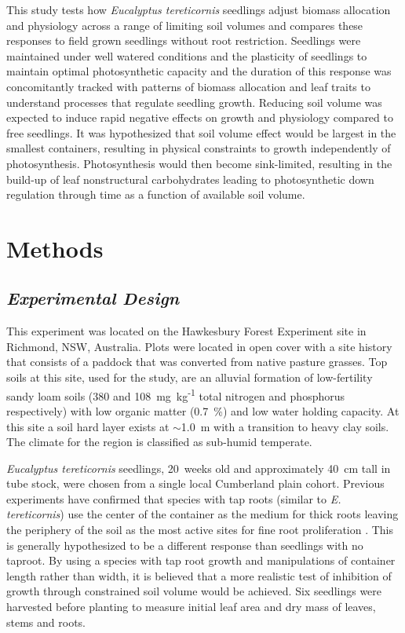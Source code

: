 \documentclass[a4paper]{article}\usepackage[]{graphicx}\usepackage[]{color}
\begin{document}
This study tests how \textit{Eucalyptus tereticornis} seedlings adjust biomass allocation and physiology across a range of limiting soil volumes and compares these responses to field grown seedlings without root restriction. Seedlings were maintained under well watered conditions and the plasticity of seedlings to maintain optimal photosynthetic capacity and the duration of this response was concomitantly tracked with patterns of biomass allocation and leaf traits to understand processes that regulate seedling growth. Reducing soil volume was expected to induce rapid negative effects on growth and physiology compared to free seedlings. It was hypothesized that soil volume effect would be largest in the smallest containers, resulting in physical constraints to growth independently of photosynthesis. Photosynthesis would then become sink-limited, resulting in the build-up of leaf nonstructural carbohydrates leading to photosynthetic down regulation through time as a function of available soil volume. 

\section*{Methods}

\subsection*{\textit{Experimental Design}}

This experiment was located on the Hawkesbury Forest Experiment site in Richmond, NSW, Australia. Plots were located in open cover with a site history that consists of a paddock that was converted from native pasture grasses. Top soils at this site, used for the study, are an alluvial formation of low-fertility sandy loam soils (380 and 108~mg~kg\textsuperscript{-1} total nitrogen and phosphorus respectively) with low organic matter (0.7~\%) and low water holding capacity. At this site a soil hard layer exists at $\sim$1.0~m with a transition to heavy clay soils. The climate for the region is classified as sub-humid temperate. 

\textit{Eucalyptus tereticornis} seedlings, 20~weeks old and approximately 40~cm tall in tube stock, were chosen from a single local Cumberland plain cohort. Previous experiments have confirmed that species with tap roots (similar to \textit{E. tereticornis}) use the center of the container as the medium for thick roots leaving the periphery of the soil as the most active sites for fine root proliferation \citep{biran1980a,biran1980b}. This is generally hypothesized to be a different response than seedlings with no taproot. By using a species with tap root growth and manipulations of container length rather than width, it is believed that a more realistic test of inhibition of growth through constrained soil volume would be achieved. Six seedlings were harvested before planting to measure initial leaf area and dry mass of leaves, stems and roots.
\end{document}
